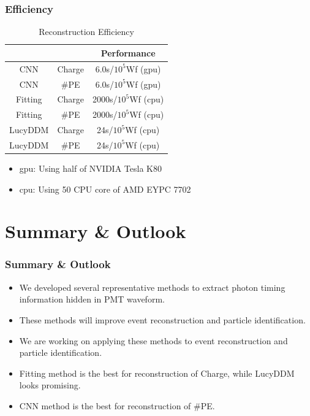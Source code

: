 \documentclass{beamer}
\begin{document}
\begin{frame}
\frametitle{Efficiency}
\begin{table}
    \centering
    \caption{Reconstruction Efficiency}
    \begin{tabular}{c|c|c}
        \hline
        &  & Performance \\
        \hline
        CNN & Charge & 6.0s/$10^{5}$Wf (gpu) \\
        \hline
        CNN & \#PE & 6.0s/$10^{5}$Wf (gpu)\\
        \hline
        Fitting & Charge & 2000s/$10^{5}$Wf (cpu) \\
        \hline
        Fitting & \#PE & 2000s/$10^{5}$Wf (cpu) \\
        \hline
        LucyDDM & Charge & 24s/$10^{5}$Wf (cpu) \\
        \hline
        LucyDDM & \#PE & 24s/$10^{5}$Wf (cpu) \\
        \hline
    \end{tabular}
\end{table}
\hspace{4mm}\begin{itemize}
    \item gpu: Using half of NVIDIA Tesla K80
    \item cpu: Using 50 CPU core of AMD EYPC 7702
\end{itemize}
\end{frame}

\section{Summary \& Outlook}
\begin{frame}
\frametitle{Summary \& Outlook}
\begin{itemize}
    \item We developed several representative methods to extract photon timing information hidden in PMT waveform. 
    \item These methods will improve event reconstruction and particle identification. 
    \item We are working on applying these methods to event reconstruction and particle identification. 
    \item Fitting method is the best for reconstruction of Charge, while LucyDDM looks promising. 
    \item CNN method is the best for reconstruction of \#PE. 
\end{itemize}
\end{frame}
\end{document}

